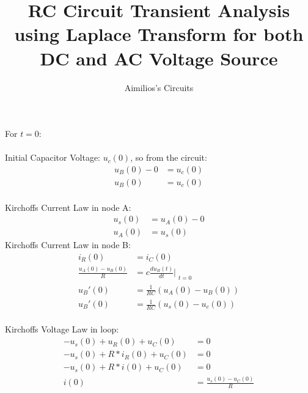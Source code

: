 \documentclass{article}
\title{RC Circuit Transient Analysis using Laplace Transform for both DC and AC Voltage Source }
\author{Aimilios's Circuits}
\begin{document}
\maketitle
{}

\section{} For $t=0$:\\
    \\Initial Capacitor Voltage: $u_c(0)$, so from the circuit:
    \begin{align}
        u_B(0)-0& = u_c(0)  \nonumber\\
        u_B(0) &= u_c(0)    \label{eq1}
    \end{align}
 \\ Kirchoffs Current Law in node A:
\begin{align}
       u_s(0) &= u_A(0) - 0 \nonumber \\
       u_A(0) &= u_s(0)     \label{eq2}
\end{align}
Kirchoffs Current Law in node B:
\begin{align}
    i_R(0)&=i_C(0) \nonumber \\
    \frac{u_A(0)-u_B(0)}{R} &= c \frac{du_B(t)}{dt}|_{\substack{t=0}} \nonumber \\
    u_B'(0)&=\frac{1}{RC}(u_A(0)-u_B(0)) \nonumber \\
  u_B'(0)&=\frac{1}{RC}(u_s(0)-u_c(0)) \label{eq3} 
\end{align}
 \\ Kirchoffs Voltage Law in loop:
\begin{align}
      -u_s(0)+u_R(0)+u_C(0)&=0 \nonumber\\
      -u_s(0)+R*i_R(0)+u_C(0)&=0 \nonumber\\
      -u_s(0)+R*i(0)+u_C(0)&=0 \nonumber\\
      i(0)&=\frac{u_s(0)-u_C(0)}{R} \label{eqn4}
\end{align}
\end{document}
